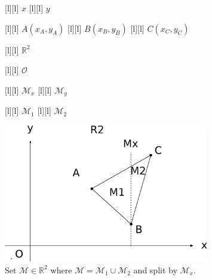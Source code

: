 \begin{figure}[ht]
	\centering
	\footnotesize

	[l] {$x$}
	[l] {$y$}

	[l] {$A(x_A,y_A)$}
	[l] {$B(x_B,y_B)$}
	[l] {$C(x_C,y_C)$}

	[l] {$\mathbb{R}^2$}

	[l] {$\mathcal{O}$}

	[l] {$\mathcal{M}_x$}
	[l] {$\mathcal{M}_y$}

	[l] {$\mathcal{M}_1$}
	[l] {$\mathcal{M}_2$}

	\includegraphics[width=0.8\textwidth]{setAinR2_Ax.eps}
	\caption{Set $\mathcal{M} \in \mathbb{R}^2$ where
		$\mathcal{M} = \mathcal{M}_{1} \cup \mathcal{M}_{2}$
		and split by $\mathcal{M}_x$.}
	\label{\LABEL}
\end{figure}
